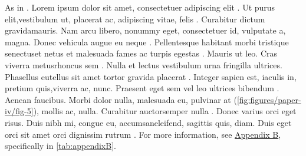 \begin{sloppypar} %

As in . Lorem  ipsum dolor sit amet, consectetuer adipiscing elit \cite{LIUDIMULYO201767}. Ut purus  elit,vestibulum ut, placerat ac, adipiscing vitae, felis . Curabitur dictum  gravidamauris. Nam arcu libero, nonummy eget, consectetuer id, vulputate a, magna. Donec vehicula augue eu neque \cite{liudimulyo_2018}. Pellentesque habitant morbi tristique senectuset netus et malesuada fames ac turpis egestas . Mauris ut leo. Cras viverra metusrhoncus sem \cite{2019liudimulyo}. Nulla et lectus vestibulum urna fringilla ultrices. Phasellus eutellus sit amet tortor gravida placerat . Integer sapien est, iaculis in, pretium quis,viverra ac, nunc. Praesent eget sem vel leo ultrices bibendum \cite{liudimulyo2020853}. Aenean faucibus. Morbi dolor nulla, malesuada eu, pulvinar at (\ref{fig:figures/paper-iv/fig-5}), mollis ac, nulla. Curabitur auctorsemper nulla . Donec varius orci eget risus. Duis nibh mi, congue eu, accumsaneleifend, sagittis quis, diam. Duis eget orci sit amet orci dignissim rutrum \cite{LIUDIMULYO201767,liudimulyo_2018,2019liudimulyo,liudimulyo2020853,liudimulyo_unpublished1,liudimulyo_unpublished2}. For more information, see \hyperref[appendix:B]{Appendix B}, specifically in \ref{tab:appendixB}.

\end{sloppypar}

